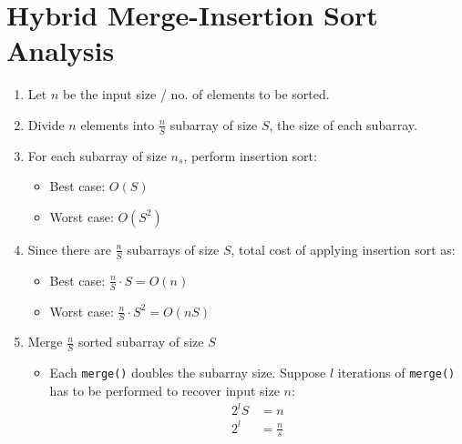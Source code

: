 \maketitle

\section{Hybrid Merge-Insertion Sort Analysis}
\begin{enumerate}
\item Let $n$ be the input size / no. of elements to be sorted.
\item Divide $n$ elements into $\frac{n}{S}$ subarray of size $S$, the size of each subarray.
\item For each subarray of size $n_s$, perform insertion sort:
  \begin{itemize}
    \item Best case: $O(S)$
    \item Worst case: $O(S^2)$
  \end{itemize}
\item Since there are $\frac{n}{S}$ subarrays of size $S$, total cost of applying insertion sort as:
  \begin{itemize}
    \item Best case: $\frac{n}{S} \cdot S = O(n)$
    \item Worst case: $\frac{n}{S} \cdot S^2 = O(nS)$
  \end{itemize}
\item Merge $\frac{n}{S}$ sorted subarray of size $S$ \\
  \begin{itemize}
    \item Each \texttt{merge()} doubles the subarray size. Suppose $l$ iterations of
      \texttt{merge()} has to be performed to recover input size $n$:
      \begin{equation}
        \begin{split}
          2^lS &= n \\
          2^l &= \frac{n}{s} \\

\end{split}
\end{equation}
\end{itemize}
\end{enumerate}
